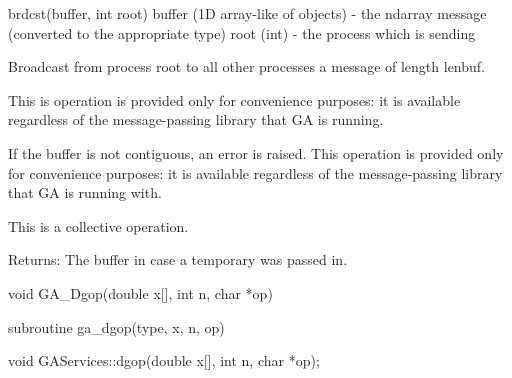 \documentclass[12pt]{article}
\begin{document}
\begin{pyapi}
\begin{pycode}
brdcst(buffer, int root) 
   buffer (1D array-like of objects) - the ndarray message
                                       (converted to the appropriate type) 
   root (int)                        - the process which is sending 
\end{pycode}
\end{pyapi}


\begin{desc}

Broadcast from process root to all other processes a message of length lenbuf.

This is operation is provided only for convenience purposes: it is available 
regardless of the message-passing library that GA is running.

If the buffer is not contiguous, an error is raised. This operation is provided 
only for convenience purposes: it is available regardless of the message-passing 
library that GA is running with.


This is a collective operation.

Returns: 
The buffer in case a temporary was passed in. 
\end{desc}


\begin{capi}
\begin{ccode}
void GA_Dgop(double x[], int n, char *op)
\end{ccode}
\begin{funcargs}
\end{funcargs}
\end{capi}

\begin{fapi}
\begin{fcode}
subroutine ga_dgop(type, x, n, op)
\end{fcode}
\begin{funcargs}
\end{funcargs}
\end{fapi}

\begin{cxxapi}
\begin{cxxcode}
void GAServices::dgop(double x[], int n, char *op);
\end{cxxcode}
\begin{funcargs}
\end{funcargs}
\end{cxxapi}
\end{document}

